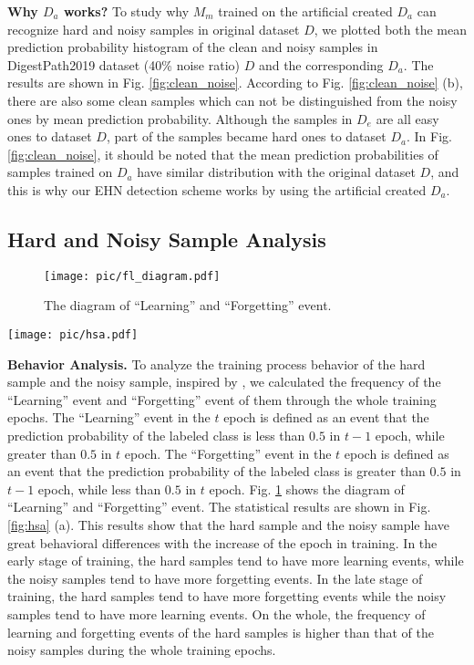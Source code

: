 {\textbf{Why $D_a$ works?} To study why $M_m$ trained on the artificial created $D_a$ can recognize hard and noisy samples in original dataset $D$, we plotted both the mean prediction probability histogram of the clean and noisy samples in DigestPath2019 dataset (40\% noise ratio) $D$ and the corresponding $D_a$. The results are shown in Fig. \ref{fig:clean_noise}. According to Fig. \ref{fig:clean_noise} (b), there are also some clean samples which can not be distinguished from the noisy ones by mean prediction probability. Although the samples in $D_e$ are all easy ones to dataset $D$, part of the samples became hard ones to dataset $D_a$. In Fig. \ref{fig:clean_noise}, it should be noted that the mean prediction probabilities of samples trained on $D_a$ have similar distribution with the original dataset $D$, and this is why our EHN detection scheme works by using the artificial created $D_a$.}




\subsection{Hard and Noisy Sample Analysis}

\begin{figure}[]
  \centering
  \texttt{[image: pic/fl\_diagram.pdf]}
\caption{{The diagram of ``Learning'' and ``Forgetting'' event.}}
  \label{fig:fl_diagram}
\end{figure}

\begin{figure*}[hbt]
  \centering
  \texttt{[image: pic/hsa.pdf]}
\caption{(a) The forgetting and learning event frequency histogram. (b) The gradient absolute value frequency histogram.} 
  \label{fig:hsa}
\end{figure*}



\textbf{Behavior Analysis.} To analyze the training process behavior of the hard sample and the noisy sample, inspired by \cite{toneva2018empirical}, we calculated the frequency of the ``Learning'' event and ``Forgetting'' event of them through the whole training epochs. The ``Learning'' event in the $t$ epoch is defined as an event that the prediction probability of the labeled class is less than $0.5$ in $t-1$ epoch, while greater than $0.5$ in $t$ epoch. The ``Forgetting'' event in the $t$ epoch is defined as an event that the prediction probability of the labeled class is greater than $0.5$ in $t-1$ epoch, while less than $0.5$ in $t$ epoch. Fig. \ref{fig:fl_diagram} shows the diagram of ``Learning'' and ``Forgetting'' event. The statistical results are shown in Fig. \ref{fig:hsa} (a). This results show that the hard sample and the noisy sample have great behavioral differences with the increase of the epoch in training. In the early stage of training, the hard samples tend to have more learning events, while the noisy samples tend to have more forgetting events. In the late stage of training, the hard samples tend to have more forgetting events while the noisy samples tend to have more learning events. On the whole, the frequency of learning and forgetting events of the hard samples is higher than that of the noisy samples during the whole training epochs.

